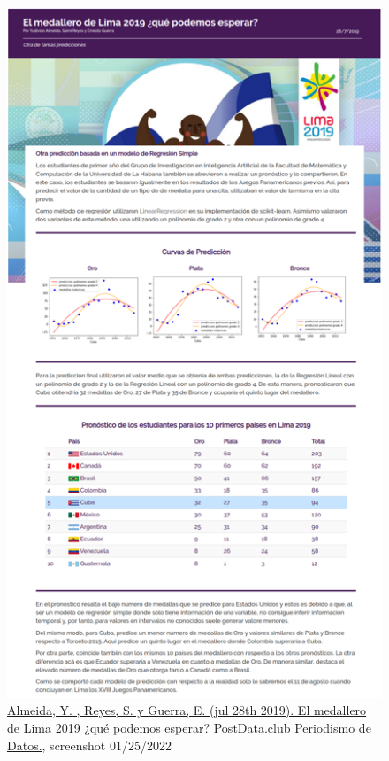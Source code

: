 \documentclass[a4paper,12pt]{article}
\begin{document}
\begin{figure}[h]
    \centering
    \includegraphics[height=0.8\textheight]{images/panamerican.png}
    \caption{\href{http://www.postdata.club/issues/201907/el-medallero-de-lima-2019-que-se-puede-esperar.html}{Almeida, Y. , Reyes, S. y Guerra, E. (jul 28th 2019). El medallero de Lima 2019 ¿qué podemos esperar? PostData.club Periodismo de Datos.}, screenshot 01/25/2022}
    \label{sec:panamerican}
\end{figure}
\end{document}
